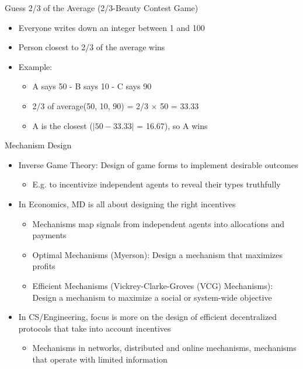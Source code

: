 \documentclass[11pt,aspectratio=169,handout]{beamer}
\begin{document}
  \begin{frame}{Guess 2/3 of the Average (2/3-Beauty Contest Game)}
   \begin{itemize}
    \item Everyone writes down an integer between 1 and 100
    \item Person closest to 2/3 of the average wins
    \pause
    \item Example:
    \begin{itemize}
     \item A says 50 - B says 10 - C says 90
     \item 2/3 of average(50, 10, 90) = 2/3 $\times$ 50 = 33.33
     \item A is the closest ($\vert 50-33.33\vert$ = 16.67), so A wins
    \end{itemize}
   \end{itemize}
  \end{frame}
  
  \begin{frame}{Mechanism Design}
   \begin{itemize}[<+->]
   \setlength{\itemsep}{1em}
    \item {\color{blue} Inverse Game Theory}: Design of game forms to implement desirable outcomes
    \begin{itemize}[<.->]
     \item E.g. to incentivize independent agents to reveal their types truthfully
    \end{itemize}
    \item In Economics, MD is all about designing the right incentives
    \begin{itemize}[<.->]
     \item Mechanisms map \alert{signals} from independent agents into allocations and payments
     \item Optimal Mechanisms (Myerson): Design a mechanism that maximizes profits
     \item Efficient Mechanisms (Vickrey-Clarke-Groves (VCG) Mechanisms): Design a mechanism to maximize a \alert{social} or system-wide objective
    \end{itemize}
    \item In CS/Engineering, focus is more on the design of efficient decentralized protocols that take into account incentives
    \begin{itemize}[<.->]
     \item Mechanisms in networks, distributed and online mechanisms, mechanisms that operate with limited information
    \end{itemize}
   \end{itemize}
  \end{frame}
  
\end{document}
